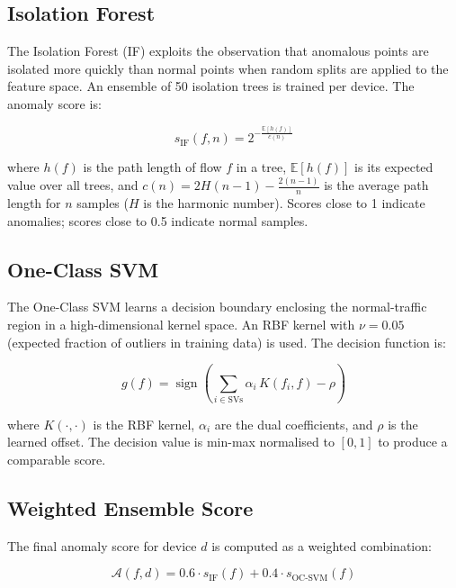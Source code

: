 \documentclass[conference]{IEEEtran}
\begin{document}
\subsection{Isolation Forest}

The Isolation Forest (IF) \cite{liu2008isolation} exploits the observation
that anomalous points are isolated more quickly than normal points when
random splits are applied to the feature space. An ensemble of 50 isolation
trees is trained per device. The anomaly score is:

\begin{equation}
    s_{\text{IF}}(f, n) = 2^{-\frac{\mathbb{E}[h(f)]}{c(n)}}
    \label{eq:iforest}
\end{equation}

where $h(f)$ is the path length of flow $f$ in a tree, $\mathbb{E}[h(f)]$
is its expected value over all trees, and
$c(n) = 2H(n-1) - \tfrac{2(n-1)}{n}$ is the average path length for $n$
samples ($H$ is the harmonic number). Scores close to 1 indicate anomalies;
scores close to 0.5 indicate normal samples.

\subsection{One-Class SVM}

The One-Class SVM \cite{scholkopf2001estimating} learns a decision boundary
enclosing the normal-traffic region in a high-dimensional kernel space. An
RBF kernel with $\nu = 0.05$ (expected fraction of outliers in training
data) is used. The decision function is:

\begin{equation}
    g(f) = \operatorname{sign}\!\left(
      \sum_{i \in \text{SVs}} \alpha_i \, K(f_i, f) - \rho
    \right)
    \label{eq:ocsvm}
\end{equation}

where $K(\cdot,\cdot)$ is the RBF kernel, $\alpha_i$ are the dual
coefficients, and $\rho$ is the learned offset. The decision value is
min-max normalised to $[0,1]$ to produce a comparable score.

\subsection{Weighted Ensemble Score}

The final anomaly score for device $d$ is computed as a weighted combination:

\begin{equation}
    \mathcal{A}(f, d) = 0.6 \cdot s_{\text{IF}}(f) + 0.4 \cdot s_{\text{OC-SVM}}(f)
    \label{eq:ensemble}
\end{equation}
\end{document}
